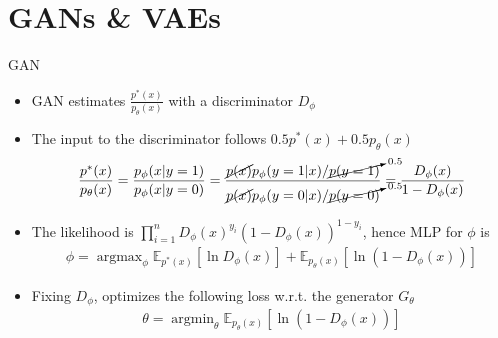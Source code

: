 \documentclass[compress]{beamer}
\newcommand{\expects}[2]{\mathbb{E}_{#1} \left[ #2 \right]}
\begin{document}
\section{GANs \& VAEs}
\begin{frame}[allowframebreaks]{GAN}
        \begin{itemize}
            \item GAN estimates $ \frac{p^*(x)}{p_{\theta}(x)} $ with a discriminator $D_{\phi}$
            \item The input to the discriminator follows $0.5 p^*(x) + 0.5p_{\theta}(x)$
                \begin{align*}
                    \frac{p^*(x)}{p_{\theta}(x)} = \frac{p_\phi(x|y=1)}{p_\phi(x|y=0)} = \frac{\cancel{p(x)}p_\phi(y=1|x)/\cancelto{0.5}{p(y=1)}}{\cancel{p(x)}p_\phi(y=0|x)/\cancelto{0.5}{p(y=0)}} = \frac{D_{\phi}(x)}{1-D_{\phi}(x)}   
                \end{align*}
            \item The likelihood is $\prod_{i=1}^n D_{\phi}(x)^{y_i}(1-D_{\phi}(x))^{1-y_i}$, hence MLP for $\phi$ is
                \begin{align*}
                    \phi = \mathop{argmax}_{\phi}\expects{p^*(x)}{\ln D_{\phi}(x)} + \expects{p_{\theta}(x)}{\ln(1-D_{\phi}(x))}
                \end{align*}
            \item Fixing $D_\phi$, optimizes the following loss w.r.t. the generator $G_{\theta}$
                \begin{align*}
                    \theta = \mathop{argmin}_{\theta} \expects{p_\theta(x)}{\ln (1-D_{\phi}(x))}
                \end{align*}
        \end{itemize}


\end{frame}
\end{document}

